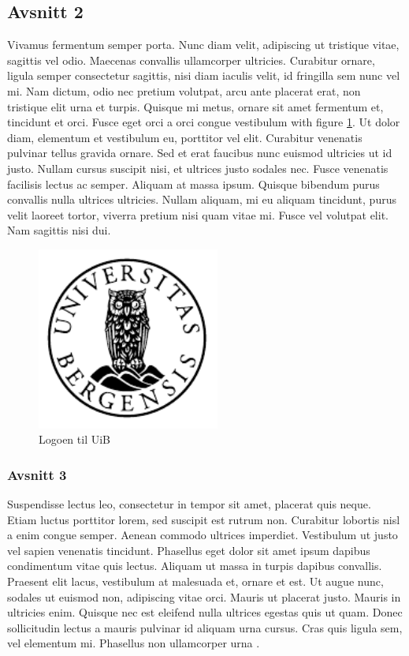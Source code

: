 \documentclass[12pt]{article}
\begin{document}
\subsection{Avsnitt 2}
\label{sec-1-1}
Vivamus fermentum semper porta. Nunc diam velit, adipiscing ut tristique vitae, sagittis vel odio. Maecenas convallis ullamcorper ultricies. Curabitur ornare, ligula semper consectetur sagittis, nisi diam iaculis velit, id fringilla sem nunc vel mi. Nam dictum, odio nec pretium volutpat, arcu ante placerat erat, non tristique elit urna et turpis. Quisque mi metus, ornare sit amet fermentum et, tincidunt et orci. Fusce eget orci a orci congue vestibulum with figure \ref{fig:logo}. Ut dolor diam, elementum et vestibulum eu, porttitor vel elit. Curabitur venenatis pulvinar tellus gravida ornare. Sed et erat faucibus nunc euismod ultricies ut id justo. Nullam cursus suscipit nisi, et ultrices justo sodales nec. Fusce venenatis facilisis lectus ac semper. Aliquam at massa ipsum. Quisque bibendum purus convallis nulla ultrices ultricies. Nullam aliquam, mi eu aliquam tincidunt, purus velit laoreet tortor, viverra pretium nisi quam vitae mi. Fusce vel volutpat elit. Nam sagittis nisi dui.


\begin{figure}[htbp]
\centering
\includegraphics[height=6cm]{uib-emblem-svart}
\caption{Logoen til UiB}
\label{fig:logo}
\end{figure}


\subsubsection{Avsnitt 3}
\label{sec-1-1-1}
Suspendisse lectus leo, consectetur in tempor sit amet, placerat quis neque. Etiam luctus porttitor lorem, sed suscipit est rutrum non. Curabitur lobortis nisl a enim congue semper. Aenean commodo ultrices imperdiet. Vestibulum ut justo vel sapien venenatis tincidunt. Phasellus eget dolor sit amet ipsum dapibus condimentum vitae quis lectus. Aliquam ut massa in turpis dapibus convallis. Praesent elit lacus, vestibulum at malesuada et, ornare et est. Ut augue nunc, sodales ut euismod non, adipiscing vitae orci. Mauris ut placerat justo. Mauris in ultricies enim. Quisque nec est eleifend nulla ultrices egestas quis ut quam. Donec sollicitudin lectus a mauris pulvinar id aliquam urna cursus. Cras quis ligula sem, vel elementum mi. Phasellus non ullamcorper urna \citep{wirth1976algorithms}.
\end{document}
